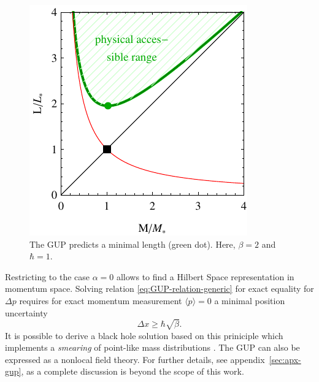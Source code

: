 \documentclass[12pt,a4paper]{report}
\numberwithin{equation}{chapter}
\begin{document}
\begin{figure}
\vspace*{-1cm}
\begin{center}
\includegraphics[scale=1]{figures/completeness-simple-gup.pdf}
\end{center}
\vspace*{-0.5cm}%
\caption[The Length-vs-Mass picture for the GUP]{The GUP predicts a minimal length (green dot). Here, $\beta=2$ and $\hbar=1$.
}\label{fig:bh-real-gup}
\label{fig:completeness-halpha}
\end{figure}

Restricting to the case $\alpha=0$ allows to find a Hilbert Space representation \cite{Kempf1994} in momentum space. Solving relation \eqref{eq:GUP-relation-generic} for exact equality for $\Delta p$ requires for exact momentum measurement $\langle p \rangle = 0$ a minimal position uncertainty
\begin{equation}
\Delta x \geq \hbar \sqrt{\beta}.
\end{equation}
It is possible to derive a black hole solution based on this priniciple which implements a \emph{smearing} of point-like mass distributions \cite{Isi1,Isi2,Knipfer2014,Marco,GUPpaedagogical}. The GUP can also be expressed as a nonlocal field theory. For further details, see appendix~\ref{sec:apx-gup}, as a complete discussion is beyond the scope of this work. 

%
\end{document}
